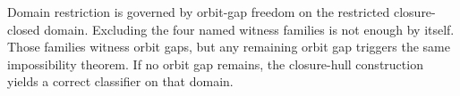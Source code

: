 Domain restriction is governed by orbit-gap freedom on the restricted closure-closed domain. Excluding the four named witness families is not enough by itself. Those families witness orbit gaps, but any remaining orbit gap triggers the same impossibility theorem. If no orbit gap remains, the closure-hull construction yields a correct classifier on that domain.

